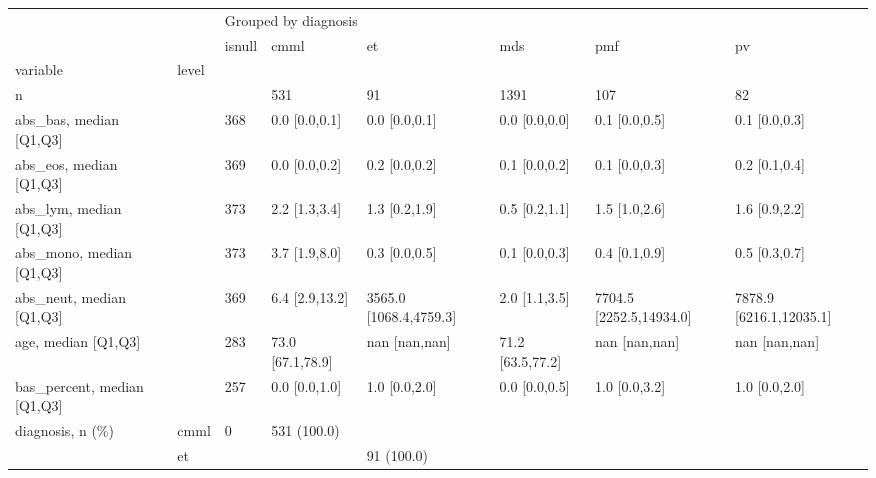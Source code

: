 \begin{tabular}{llllllll}
\toprule
                               &    & \multicolumn{6}{l}{Grouped by diagnosis} \\
                               &    &               isnull &              cmml &                      et &               mds &                       pmf &                        pv \\
variable & level &                      &                   &                         &                   &                           &                           \\
\midrule
n &    &                      &               531 &                      91 &              1391 &                       107 &                        82 \\
abs\_bas, median [Q1,Q3] &    &                  368 &     0.0 [0.0,0.1] &           0.0 [0.0,0.1] &     0.0 [0.0,0.0] &             0.1 [0.0,0.5] &             0.1 [0.0,0.3] \\
abs\_eos, median [Q1,Q3] &    &                  369 &     0.0 [0.0,0.2] &           0.2 [0.0,0.2] &     0.1 [0.0,0.2] &             0.1 [0.0,0.3] &             0.2 [0.1,0.4] \\
abs\_lym, median [Q1,Q3] &    &                  373 &     2.2 [1.3,3.4] &           1.3 [0.2,1.9] &     0.5 [0.2,1.1] &             1.5 [1.0,2.6] &             1.6 [0.9,2.2] \\
abs\_mono, median [Q1,Q3] &    &                  373 &     3.7 [1.9,8.0] &           0.3 [0.0,0.5] &     0.1 [0.0,0.3] &             0.4 [0.1,0.9] &             0.5 [0.3,0.7] \\
abs\_neut, median [Q1,Q3] &    &                  369 &    6.4 [2.9,13.2] &  3565.0 [1068.4,4759.3] &     2.0 [1.1,3.5] &   7704.5 [2252.5,14934.0] &   7878.9 [6216.1,12035.1] \\
age, median [Q1,Q3] &    &                  283 &  73.0 [67.1,78.9] &           nan [nan,nan] &  71.2 [63.5,77.2] &             nan [nan,nan] &             nan [nan,nan] \\
bas\_percent, median [Q1,Q3] &    &                  257 &     0.0 [0.0,1.0] &           1.0 [0.0,2.0] &     0.0 [0.0,0.5] &             1.0 [0.0,3.2] &             1.0 [0.0,2.0] \\
diagnosis, n (\%) & cmml &                    0 &       531 (100.0) &                         &                   &                           &                           \\
                               & et &                      &                   &              91 (100.0) &                   &                           &                           \\

\end{tabular}
